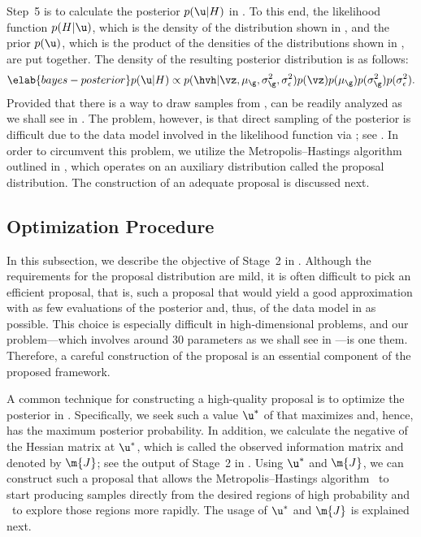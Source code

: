 Step~5 is to calculate the posterior $p(\u | H)$ in . To
this end, the likelihood function $p(H | \u)$, which is the density of the
distribution shown in , and the prior $p(\u)$, which is
the product of the densities of the distributions shown in ,
are put together. The density of the resulting posterior distribution is as
follows:
\begin{equation} \elab{bayes-posterior}
  p(\u | H) \propto p(\hvh | \vz, \mu_\g, \sigma^2_\g, \sigma^2_\epsilon) p(\vz) p(\mu_\g) p(\sigma^2_\g) p(\sigma^2_\epsilon).
\end{equation}
Provided that there is a way to draw samples from , \g can
be readily analyzed as we shall see in . The
problem, however, is that direct sampling of the posterior is difficult due to
the data model involved in the likelihood function via \vh; see
. In order to circumvent this problem, we utilize the
Metropolis--Hastings algorithm \cite{gelman2013} outlined in
, which operates on an auxiliary distribution called
the proposal distribution. The construction of an adequate proposal is discussed
next.

\subsection{Optimization Procedure}

In this subsection, we describe the objective of Stage~2 in
. Although the requirements for the proposal distribution
are mild, it is often difficult to pick an efficient proposal, that is, such a
proposal that would yield a good approximation with as few evaluations of the
posterior and, thus, of the data model in  as possible.
This choice is especially difficult in high-dimensional problems, and our
problem---which involves around 30 parameters as we shall see in
---is one them. Therefore, a careful construction of the
proposal is an essential component of the proposed framework.

A common technique for constructing a high-quality proposal is to optimize the
posterior in . Specifically, we seek such a value $\u^*$
of \u that maximizes  and, hence, has the maximum
posterior probability. In addition, we calculate the negative of the Hessian
matrix at $\u^*$, which is called the observed information matrix and denoted by
$\m{J}$; see the output of Stage~2 in . Using $\u^*$ and
$\m{J}$, we can construct such a proposal that allows the Metropolis--Hastings
algorithm \one~to start producing samples directly from the desired regions of
high probability and \two~to explore those regions more rapidly. The usage of
$\u^*$ and $\m{J}$ is explained next.

